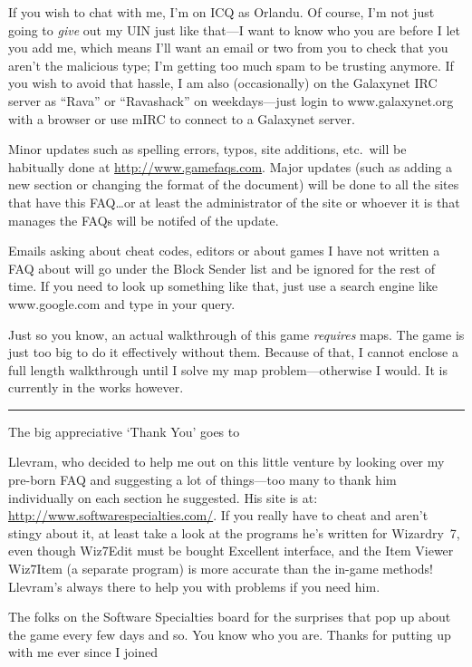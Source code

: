 \documentclass[11pt]{report}
\begin{document}
If you wish to chat with me, I'm on ICQ as Orlandu. Of course, I'm not
just going to \emph{give} out my UIN just like that---I want to know who
you are before I let you add me, which means I'll want an email or two
from you to check that you aren't the malicious type; I'm getting too
much spam to be trusting anymore. If you wish to avoid that hassle, I am
also (occasionally) on the Galaxynet IRC server as ``Rava'' or
``Ravashack'' on weekdays---just login to www.galaxynet.org with a
browser or use mIRC to connect to a Galaxynet server.

Minor updates such as spelling errors, typos, site additions, etc.\ will
be habitually done at \url{http://www.gamefaqs.com}. Major updates (such
as adding a new section or changing the format of the document) will be
done to all the sites that have this FAQ\ldots{}or at least the
administrator of the site or whoever it is that manages the FAQs will be
notifed of the update.

Emails asking about cheat codes, editors or about games I have not
written a FAQ about will go under the Block Sender list and be ignored
for the rest of time. If you need to look up something like that, just
use a search engine like www.google.com and type in your query.

Just so you know, an actual walkthrough of this game \emph{requires}
maps. The game is just too big to do it effectively without them.
Because of that, I cannot enclose a full length walkthrough until I
solve my map problem---otherwise I would. It is currently in the works
however.

\begin{center}\rule{0.5\linewidth}{\linethickness}\end{center}

The big appreciative `Thank You' goes to

Llevram, who decided to help me out on this little venture by looking over my
pre-born FAQ and suggesting a lot of things---too many to thank him
individually on each section he suggested. His site is at:
\url{http://www.softwarespecialties.com/}. If you really have to cheat and
aren't stingy about it, at least take a look at the programs he's written for
Wizardry~7, even though Wiz7Edit must be bought Excellent interface, and the
Item Viewer Wiz7Item (a separate program) is more accurate than the in-game
methods! Llevram's always there to help you with problems if you need him.

The folks on the Software Specialties board for the surprises that pop
up about the game every few days and so. You know who you are. Thanks
for putting up with me ever since I joined
\end{document}

